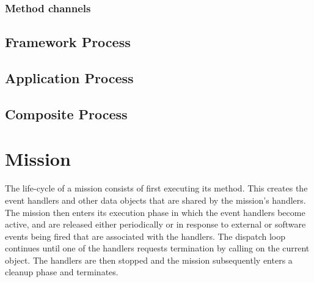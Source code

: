 \documentclass{article}
\begin{document}
\begin{circusbox}

\end{circusbox}

\subsubsection*{Method channels}

\begin{circusbox}

\end{circusbox}

\subsection{Framework Process}

\begin{circusbox}

\end{circusbox}

\subsection{Application Process}

\begin{circusbox}

\end{circusbox}

\subsection{Composite Process}

\begin{circusbox}

\end{circusbox}

\newpage


\section{Mission}

The life-cycle of a mission consists of first executing its  method. This creates the event handlers and other data objects that are shared by the mission's handlers. The mission then enters its execution phase in which the event handlers become active, and are released either periodically or in response to external or software events being fired that are associated with the handlers. The dispatch loop continues until one of the handlers requests termination by calling  on the current  object. The handlers are then stopped and the mission subsequently enters a cleanup phase and terminates.
\end{document}
